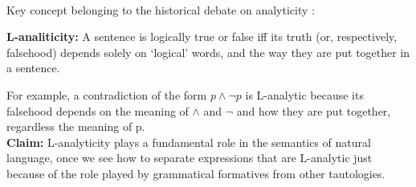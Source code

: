 \documentclass[a4paper,11pt]{article}
\begin{document}
 \paragraph{}
 Key concept belonging to the historical debate on analyticity \citep{Car34,Qui60}: 
 \begin{exe}
 \ex \textbf{L-analiticity:} A sentence is logically true or false iff its truth (or, respectively, falsehood) depends solely on `logical' words, and the way they are put together in a sentence. 
 \end{exe}
 For example, a contradiction of the form $p\wedge \neg p$ is L-analytic because its falsehood depends on the meaning of $\wedge$ and $\neg$ and how they are put together, regardless the meaning of p.
 \\\textbf{Claim:} L-analyticity plays a fundamental role in the semantics of natural language, once we see how to separate expressions that are L-analytic just because of the role played by grammatical formatives from other tautologies.
\end{document}
